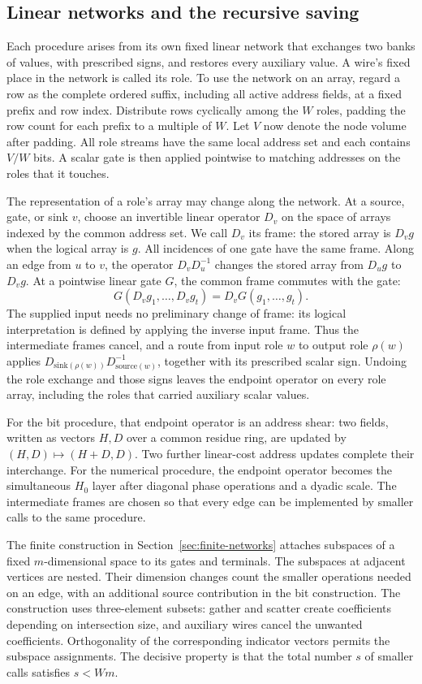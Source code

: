 \documentclass[11pt]{article}
\theoremstyle{definition}
\begin{document}
\subsection{Linear networks and the recursive saving}

Each procedure arises from its own fixed linear network that exchanges two
banks of values, with prescribed signs, and restores every auxiliary
value. A wire's fixed place in the network is called its role. To use
the network on an array, regard a row as the complete ordered suffix,
including all active address fields, at a fixed prefix and row index.
Distribute rows cyclically among the $W$ roles, padding the row count
for each prefix to a multiple of $W$. Let $V$ now denote the node volume
after padding. All role streams have the same local address set and each
contains $V/W$ bits. A scalar gate is then applied
pointwise to matching addresses on the roles that it touches.

The representation of a role's array may change along the network.
At a source, gate, or sink $v$, choose an invertible linear operator
$D_v$ on the space of arrays indexed by the common address set. We call $D_v$ its frame: the stored
array is $D_vg$ when the logical array is $g$. All incidences of one
gate have the same frame. Along an edge from $u$ to $v$, the operator
$D_vD_u^{-1}$ changes the stored array from $D_ug$ to $D_vg$.
At a pointwise linear gate $G$, the common frame commutes with the gate:
\[
 G(D_vg_1,\ldots,D_vg_t)=D_vG(g_1,\ldots,g_t).
\]
The supplied input needs no preliminary change of frame: its logical
interpretation is defined by applying the inverse input frame. Thus the
intermediate frames cancel, and a route from input role $w$ to output
role $\rho(w)$ applies
$D_{\mathrm{sink}(\rho(w))}D_{\mathrm{source}(w)}^{-1}$, together with
its prescribed scalar sign. Undoing the role exchange and those signs
leaves the endpoint operator on every role array, including the roles
that carried auxiliary scalar values.

For the bit procedure, that endpoint operator is an address shear:
two fields, written as vectors $H,D$ over a common residue ring, are
updated by $(H,D)\mapsto(H+D,D)$. Two further linear-cost address
updates complete their interchange. For the numerical procedure, the
endpoint operator becomes the simultaneous $H_0$ layer after diagonal
phase operations and a dyadic scale. The intermediate frames are chosen
so that every edge can be implemented by smaller calls to the same
procedure.

The finite construction in Section~\ref{sec:finite-networks} attaches
subspaces of a fixed $m$-dimensional space to its gates and terminals.
The subspaces at adjacent vertices are nested. Their dimension changes
count the smaller operations needed on an edge, with an additional
source contribution in the bit construction. The construction uses
three-element subsets: gather and scatter create coefficients depending
on intersection size, and auxiliary wires cancel the unwanted
coefficients. Orthogonality of the corresponding indicator vectors permits
the subspace assignments. The decisive property is that the total
number $s$ of smaller calls satisfies $s<Wm$.
\end{document}
